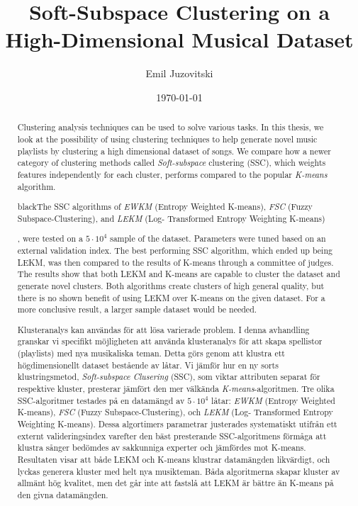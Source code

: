 \documentclass[master]{kththesis}
\title{Soft-Subspace Clustering on a High-Dimensional Musical Dataset}
\author{Emil Juzovitski}
\date{\today}
\begin{document}
\frontmatter

\titlepage

\begin{abstract}
Clustering analysis techniques can be used to solve various tasks. In this thesis, we look at the possibility of using clustering techniques to help generate novel music playlists by clustering a high dimensional dataset of songs. We compare how a newer category of clustering methods called \textit{Soft-subspace} clustering (SSC), which weights features independently for each cluster, performs compared to the popular \textit{K-means} algorithm. \begin{color}{black}{The SSC algorithms of \textit{EWKM} (Entropy Weighted K-means), \textit{FSC} (Fuzzy Subspace-Clustering), and \textit{LEKM} (Log- Transformed Entropy Weighting K-means)}\end{color}, were tested on a $5 \cdot 10^4$ sample of the dataset. Parameters were tuned based on an external validation index. The best performing SSC algorithm, which ended up being LEKM, was then compared to the results of K-means through a committee of judges. The results show that both LEKM and K-means are capable to cluster the dataset and generate novel clusters. Both algorithms create clusters of high general quality, but there is no shown benefit of using LEKM over K-means on the given dataset. For a more conclusive result, a larger sample dataset would be needed.
\end{abstract}


\begin{otherlanguage}{swedish}
  \begin{abstract}
  Klusteranalys kan användas för att lösa varierade problem. I denna avhandling granskar vi specifikt möjligheten att använda klusteranalys för att skapa spellistor (playlists) med nya musikaliska teman. Detta görs genom att klustra ett högdimensionellt dataset bestående av låtar. Vi jämför hur en ny sorts klustringsmetod, \textit{Soft-subspace Clusering} (SSC), som viktar attributen separat för respektive kluster, presterar jämfört den mer välkända \textit{K-means}-algoritmen. Tre olika SSC-algoritmer testades på en datamängd av $5 \cdot 10^4$ låtar: \textit{EWKM} (Entropy Weighted K-means), \textit{FSC} (Fuzzy Subspace-Clustering), och \textit{LEKM} (Log- Transformed Entropy Weighting K-means). Dessa algortimers parametrar justerades systematiskt utifrån ett externt valideringsindex varefter den bäst presterande SSC-algoritmens förmåga att klustra sånger bedömdes av sakkunniga experter och jämfördes mot K-means. Resultaten visar att både LEKM och K-means klustrar datamängden likvärdigt, och lyckas generera kluster med helt nya musikteman. Båda algoritmerna skapar kluster av allmänt hög kvalitet, men det går inte att fastslå att LEKM är bättre än K-means på den givna datamängden.
  \end{abstract}
\end{otherlanguage}
\end{document}
